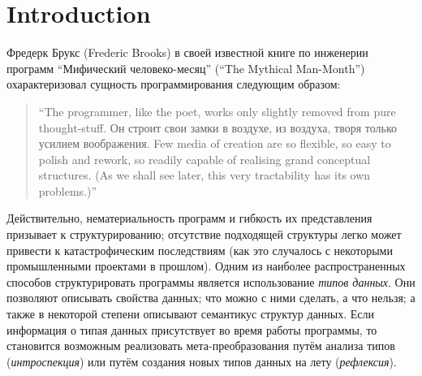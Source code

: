 \section{Introduction}

Фредерк Брукс (Frederic Brooks) в своей известной книге по инженерии
программ  ``Мифический человеко-месяц'' (``The Mythical Man-Month'')~\cite{MMM} охарактеризовал сущность программирования следующим образом:

\blockquote{``The programmer, like the poet, works only slightly removed from pure thought-stuff. Он строит свои замки в воздухе, из воздуха, творя только усилием воображения. Few media of
creation are so flexible, so easy to polish and rework, so readily capable of realising grand conceptual structures. (As we shall see later, this very tractability has its own problems.)''}

Действительно, нематериальность программ и гибкость их представления  призывает к структурированию; отсутствие подходящей структуры легко может привести к катастрофическим последствиям
(как это случалось с некоторыми промышленными проектами в прошлом). Одним из наиболее распространенных способов структурировать программы является использование \emph{типов данных}. Они позволяют описывать свойства данных; что можно с ними сделать, а что нельзя; а также в некоторой степени описывают семантикус структур данных. Если информация о типая данных присутствует во время работы программы, то становится возможным реализовать мета-преобразования путём анализа типов (\emph{интроспекция}) или путём создания новых типов данных на лету (\emph{рефлексия}).

